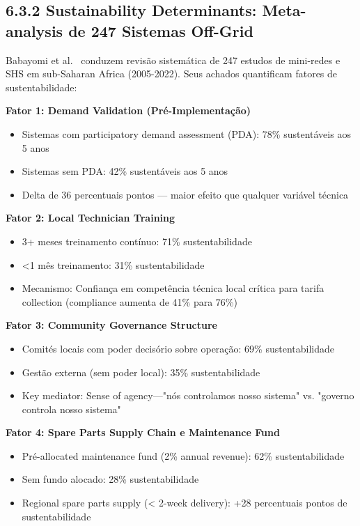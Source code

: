 \documentclass[12pt, a4paper]{article}
\begin{document}
\subsection*{6.3.2 Sustainability Determinants: Meta-analysis de 247 Sistemas Off-Grid}

Babayomi et al.~\citep{Babayomi2023} conduzem revisão sistemática de 247 estudos de mini-redes e SHS em sub-Saharan Africa (2005-2022). Seus achados quantificam fatores de sustentabilidade:

\textbf{Fator 1: Demand Validation (Pré-Implementação)}
\begin{itemize}
\item Sistemas com participatory demand assessment (PDA): 78\% sustentáveis aos 5 anos
\item Sistemas sem PDA: 42\% sustentáveis aos 5 anos
\item Delta de 36 percentuais pontos — maior efeito que qualquer variável técnica
\end{itemize}

\textbf{Fator 2: Local Technician Training}
\begin{itemize}
\item 3+ meses treinamento contínuo: 71\% sustentabilidade
\item <1 mês treinamento: 31\% sustentabilidade
\item Mecanismo: Confiança em competência técnica local crítica para tarifa collection (compliance aumenta de 41\% para 76\%)
\end{itemize}

\textbf{Fator 3: Community Governance Structure}
\begin{itemize}
\item Comités locais com poder decisório sobre operação: 69\% sustentabilidade
\item Gestão externa (sem poder local): 35\% sustentabilidade
\item Key mediator: Sense of agency—"nós controlamos nosso sistema" vs. "governo controla nosso sistema"
\end{itemize}

\textbf{Fator 4: Spare Parts Supply Chain e Maintenance Fund}
\begin{itemize}
\item Pré-allocated maintenance fund (2\% annual revenue): 62\% sustentabilidade
\item Sem fundo alocado: 28\% sustentabilidade
\item Regional spare parts supply (< 2-week delivery): +28 percentuais pontos de sustentabilidade
\end{itemize}
\end{document}
